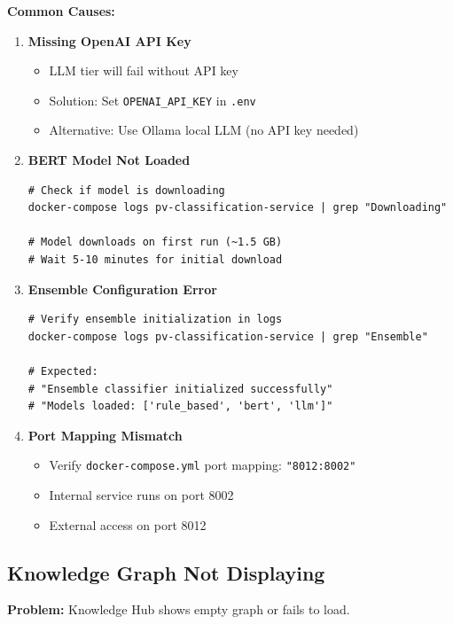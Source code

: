 \textbf{Common Causes:}

\begin{enumerate}
    \item \textbf{Missing OpenAI API Key}
    \begin{itemize}
        \item LLM tier will fail without API key
        \item Solution: Set \texttt{OPENAI\_API\_KEY} in \texttt{.env}
        \item Alternative: Use Ollama local LLM (no API key needed)
    \end{itemize}

    \item \textbf{BERT Model Not Loaded}
    \begin{lstlisting}[style=bashstyle]
# Check if model is downloading
docker-compose logs pv-classification-service | grep "Downloading"

# Model downloads on first run (~1.5 GB)
# Wait 5-10 minutes for initial download
\end{lstlisting}

    \item \textbf{Ensemble Configuration Error}
    \begin{lstlisting}[style=pythonstyle]
# Verify ensemble initialization in logs
docker-compose logs pv-classification-service | grep "Ensemble"

# Expected:
# "Ensemble classifier initialized successfully"
# "Models loaded: ['rule_based', 'bert', 'llm']"
\end{lstlisting}

    \item \textbf{Port Mapping Mismatch}
    \begin{itemize}
        \item Verify \texttt{docker-compose.yml} port mapping: \texttt{"8012:8002"}
        \item Internal service runs on port 8002
        \item External access on port 8012
    \end{itemize}
\end{enumerate}

\subsection{Knowledge Graph Not Displaying}

\textbf{Problem:} Knowledge Hub shows empty graph or fails to load.

